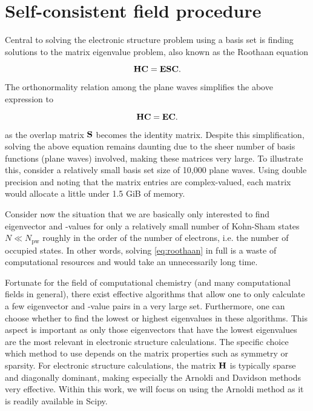 %
%
%
\section{Self-consistent field procedure}

Central to solving the electronic structure problem using a basis set is finding solutions to the matrix eigenvalue problem, also known as the Roothaan equation

\begin{equation}
    \mathbf{H}\mathbf{C} = \mathbf{E}\mathbf{S}\mathbf{C}.
\end{equation}

The orthonormality relation among the plane waves simplifies the above expression to

\begin{equation}
    \mathbf{H}\mathbf{C} = \mathbf{E}\mathbf{C}.
    \label{eq:roothaan}
\end{equation}

as the overlap matrix $\mathbf{S}$ becomes the identity matrix. Despite this simplification, solving the above equation remains daunting due to the sheer number of basis functions (plane waves) involved, making these matrices very large. To illustrate this, consider a relatively small basis set size of 10,000 plane waves. Using double precision and noting that the matrix entries are complex-valued, each matrix would allocate a little under 1.5 GiB of memory.

Consider now the situation that we are basically only interested to find eigenvector and -values for only a relatively small number of Kohn-Sham states $N \ll N_{\textrm{pw}}$ roughly in the order of the number of electrons, i.e. the number of occupied states. In other words, solving \cref{eq:roothaan} in full is a waste of computational resources and would take an unnecessarily long time.

Fortunate for the field of computational chemistry (and many computational fields in general), there exist effective algorithms that allow one to only calculate a few eigenvector and -value pairs in a very large set. Furthermore, one can choose whether to find the lowest or highest eigenvalues in these algorithms. This aspect is important as only those eigenvectors that have the lowest eigenvalues are the most relevant in electronic structure calculations. The specific choice which method to use depends on the matrix properties such as symmetry or sparsity. For electronic structure calculations, the matrix $\mathbf{H}$ is typically sparse and diagonally dominant, making especially the Arnoldi\cite{1951:arnoldi} and Davidson\cite{1975:davidson} methods very effective. Within this work, we will focus on using the Arnoldi method as it is readily available in Scipy.\cite{arnoldi_scipy}

